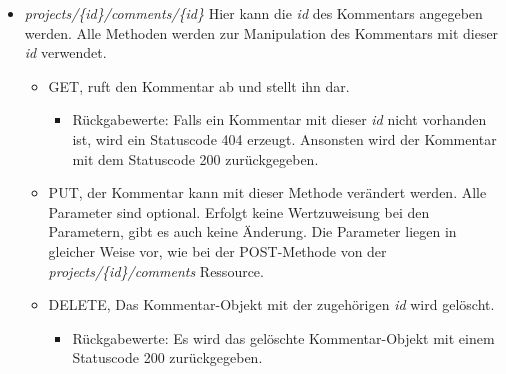 \documentclass[12pt]{scrartcl}
\begin{document}
\begin{itemize}
\begin{itemize}
\begin{itemize}
					\end{itemize}
		\end{itemize}
			\item \emph{projects/\{id\}/comments/\{id\}} Hier kann die \emph{id} des Kommentars angegeben werden. Alle Methoden werden zur Manipulation des Kommentars mit dieser \emph{id} verwendet.
			\begin{itemize}
					\item GET, ruft den Kommentar ab und stellt ihn dar. 
					\begin{itemize}
						\item Rückgabewerte: Falls ein Kommentar mit dieser \emph{id} nicht vorhanden ist, wird ein Statuscode 404 erzeugt. Ansonsten wird der Kommentar mit dem Statuscode 200 zurückgegeben.
					\end{itemize}
					\item PUT, der Kommentar kann mit dieser Methode verändert werden. Alle Parameter sind optional. Erfolgt keine Wertzuweisung bei den Parametern, gibt es auch keine Änderung. Die Parameter liegen in gleicher Weise vor, wie bei der POST-Methode von der \emph{projects/\{id\}/comments} Ressource.
					\item DELETE, Das Kommentar-Objekt mit der zugehörigen \emph{id} wird gelöscht.
					\begin{itemize}
						\item Rückgabewerte: Es wird das gelöschte Kommentar-Objekt mit einem Statuscode 200 zurückgegeben.
					\end{itemize}
			\end{itemize}
	\end{itemize}
\end{document}
